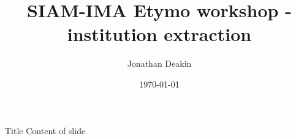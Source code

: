 \documentclass{beamer}
\begin{document}
\title{SIAM-IMA Etymo workshop - institution extraction}
\author{Jonathan Deakin}
\date{\today}

\begin{frame}
  \maketitle
\end{frame}

\begin{frame}{Title}
  Content of slide
\end{frame}
\end{document}
